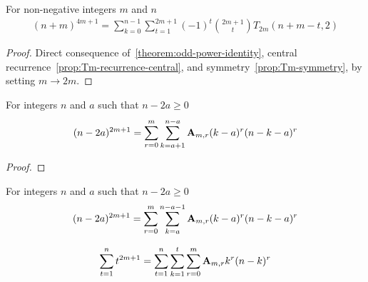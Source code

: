 \begin{proposition} For non-negative integers $m$ and $n$
    \label{prop:odd-power-decomposition-central-shifted}
    \begin{align*}
    (n+m)
        ^{4m+1} = \sum_{k=0}^{n-1} \sum_{t=1}^{2m+1} (-1)^{t} \binom{2m+1}{t} T_{2m} (n+m-t, 2)
    \end{align*}
    \begin{proof}
        Direct consequence of~\eqref{theorem:odd-power-identity},
        central recurrence~\eqref{prop:Tm-recurrence-central}, and symmetry~\eqref{prop:Tm-symmetry},
        by setting $m \rightarrow 2m$.
    \end{proof}
\end{proposition}

\begin{proposition}
    \label{prop:odd-power-binomial}
    For integers $n$ and $a$ such that $n-2a \geq 0$
    \begin{align*}
    (n-2a)
        ^{2m+1} = \sum_{r=0}^{m} \sum_{k=a+1}^{n-a} {\mathbf{A}} \sb{m,r} (k-a)^r (n-k-a)^r
    \end{align*}
    \begin{proof}
    \end{proof}
\end{proposition}

\begin{corollary}
    \label{prop:odd-power-binomial-shifted}
    For integers $n$ and $a$ such that $n-2a \geq 0$
    \begin{align*}
    (n-2a)
        ^{2m+1} = \sum_{r=0}^{m} \sum_{k=a}^{n-a-1} {\mathbf{A}} \sb{m,r} (k-a)^r (n-k-a)^r
    \end{align*}
\end{corollary}

\begin{proposition}
    \label{prop:sum-of-odd-powers}
    \begin{align*}
        \sum_{t=1}^{n} t^{2m+1} = \sum_{t=1}^{n} \sum_{k=1}^{t} \sum_{r=0}^{m} {\mathbf{A}} \sb{m,r} k^r (n-k)^r
    \end{align*}
\end{proposition}

